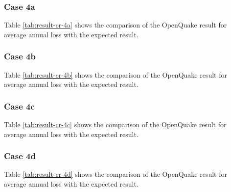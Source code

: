 \subsubsection{Case 4a}


Table \ref{tab:result-cr-4a} shows the comparison of the OpenQuake result for average annual loss with the expected result.

\subsubsection{Case 4b}


Table \ref{tab:result-cr-4b} shows the comparison of the OpenQuake result for average annual loss with the expected result.

\subsubsection{Case 4c}


Table \ref{tab:result-cr-4c} shows the comparison of the OpenQuake result for average annual loss with the expected result.

\subsubsection{Case 4d}


Table \ref{tab:result-cr-4d} shows the comparison of the OpenQuake result for average annual loss with the expected result.
